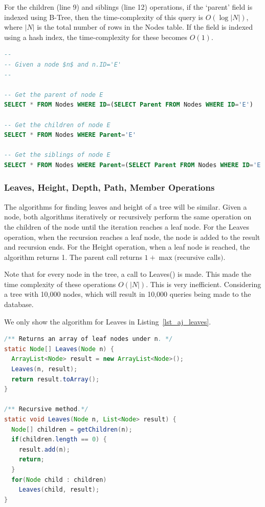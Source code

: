 For the children (line 9) and siblings (line 12) operations, if the `parent' field is indexed using B-Tree\cite{btree}, then the time-complexity of this query is $O(\log |N|)$, where $|N|$ is the total number of rows in the Nodes table. If the field is indexed using a hash index, the time-complexity for these becomes $O(1)$.

\begin{lstlisting}[language=sql,caption={Parent, Children, and Sibling}, label=lst_aj_parent, float]
--
-- Given a node $n$ and n.ID='E'
--

-- Get the parent of node E
SELECT * FROM Nodes WHERE ID=(SELECT Parent FROM Nodes WHERE ID='E')

-- Get the children of node E
SELECT * FROM Nodes WHERE Parent='E'

-- Get the siblings of node E
SELECT * FROM Nodes WHERE Parent=(SELECT Parent FROM Nodes WHERE ID='E') AND ID != 'E'

\end{lstlisting}

\subsubsection{Leaves, Height, Depth, Path, Member Operations}\label{sec_al_depth}

The algorithms for finding leaves and height of a tree will be similar. Given a node, both algorithms iteratively or recursively perform the same operation on the children of the node until the iteration reaches a leaf node. For the Leaves operation, when the recursion reaches a leaf node, the node is added to the result and recursion ends. For the Height operation, when a leaf node is reached, the algorithm returns 1. The parent call returns $1 + \max($recursive calls$)$.

Note that for every node in the tree, a call to Leaves() is made. This made the time complexity of these operations $O(|N|)$. This is very inefficient. Considering a tree with 10,000 nodes, which will result in 10,000 queries being made to the database.

We only show the algorithm for Leaves in Listing~\ref{lst_aj_leaves}.

\begin{lstlisting}[language=java,caption=Leaves, label=lst_aj_leaves, float]
/** Returns an array of leaf nodes under n. */
static Node[] Leaves(Node n) {
  ArrayList<Node> result = new ArrayList<Node>();
  Leaves(n, result);
  return result.toArray();
}

/** Recursive method.*/
static void Leaves(Node n, List<Node> result) {
  Node[] children = getChildren(n);
  if(children.length == 0) {
    result.add(n);
    return;
  }
  for(Node child : children)
    Leaves(child, result);
}

\end{lstlisting}

